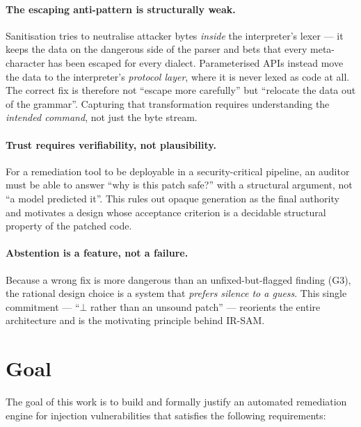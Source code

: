 \documentclass[11pt,a4paper]{article}
\newcommand{\bottom}{\ensuremath{\bot}}
\newcommand{\irsam}{\mbox{IR\nobreakdash-SAM}}
\begin{document}
\paragraph{The escaping anti-pattern is structurally weak.} Sanitisation
tries to neutralise attacker bytes \emph{inside} the interpreter's lexer
--- it keeps the data on the dangerous side of the parser and bets that
every meta-character has been escaped for every dialect. Parameterised
APIs instead move the data to the interpreter's \emph{protocol layer},
where it is never lexed as code at all. The correct fix is therefore not
``escape more carefully'' but ``relocate the data out of the grammar''.
Capturing that transformation requires understanding the \emph{intended
command}, not just the byte stream.

\paragraph{Trust requires verifiability, not plausibility.} For a
remediation tool to be deployable in a security-critical pipeline, an
auditor must be able to answer ``why is this patch safe?'' with a
structural argument, not ``a model predicted it''. This rules out
opaque generation as the final authority and motivates a design whose
acceptance criterion is a decidable structural property of the patched
code.

\paragraph{Abstention is a feature, not a failure.} Because a wrong fix
is more dangerous than an unfixed-but-flagged finding (G3), the rational
design choice is a system that \emph{prefers silence to a guess}. This
single commitment --- ``\bottom{} rather than an unsound patch'' ---
reorients the entire architecture and is the motivating principle behind
\irsam.

\section{Goal}

The goal of this work is to build and formally justify an automated
remediation engine for injection vulnerabilities that satisfies the
following requirements:
\end{document}
